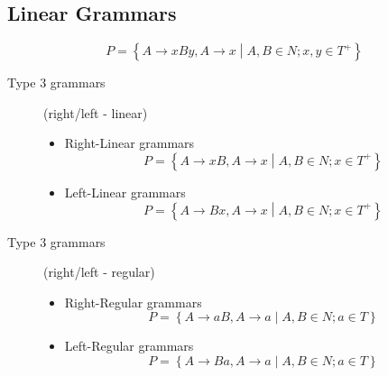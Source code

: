 \subsection{Linear Grammars}
$$
    P = \left\{A \to xBy, A \to x \middle| A, B \in N; x,y \in T^+ \right\}
$$
\begin{description}
    \item[Type 3 grammars] (right/left - linear)
    \begin{itemize}
        \item Right-Linear grammars
            $$
                P = \left\{A \to xB, A \to x \middle| A, B \in N; x \in T^+ \right\}
            $$
        \item Left-Linear grammars
            $$
                P = \left\{A \to Bx, A \to x \middle| A, B \in N; x \in T^+ \right\}
            $$
    \end{itemize}
    \item[Type 3 grammars] (right/left - regular)
    \begin{itemize}
        \item Right-Regular grammars
            $$
                P = \left\{A \to aB, A \to a \middle| A, B \in N; a \in T \right\}
            $$
        \item Left-Regular grammars
            $$
                P = \left\{A \to Ba, A \to a \middle| A, B \in N; a \in T \right\}
            $$
    \end{itemize}
\end{description}